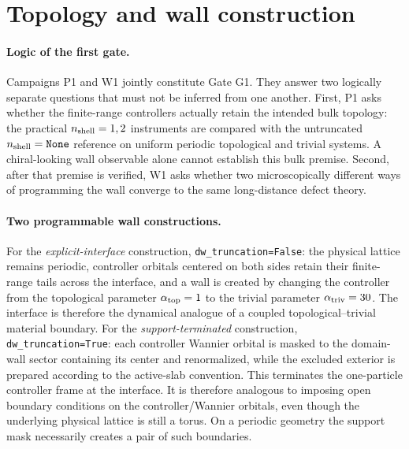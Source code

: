 \documentclass[aps,prx,twocolumn,floatfix,nofootinbib,superscriptaddress,longbibliography]{revtex4-2}
\newcommand{\code}[1]{\texttt{#1}}
\begin{document}
\section{Topology and wall construction}

\paragraph*{Logic of the first gate.}
Campaigns P1 and W1 jointly constitute Gate G1.  They answer two logically separate
questions that must not be inferred from one another.  First, P1 asks whether the
finite-range controllers actually retain the intended bulk topology: the practical
$n_{\rm shell}=1,2$ instruments are compared with the untruncated
$n_{\rm shell}=\texttt{None}$ reference on uniform periodic topological and trivial
systems.  A chiral-looking wall observable alone cannot establish this bulk premise.
Second, after that premise is verified, W1 asks whether two microscopically different
ways of programming the wall converge to the same long-distance defect theory.

\paragraph*{Two programmable wall constructions.}\mbox{}\linebreak
For the \emph{explicit-interface} construction,
\code{dw\_truncation=False}: the physical lattice remains periodic, controller orbitals
centered on both sides retain their finite-range tails across the interface, and a wall is
created by changing the controller from the topological parameter
$\alpha_{\rm top}=1$ to the trivial parameter $\alpha_{\rm triv}=30$.  The interface is
therefore the dynamical analogue of a coupled topological--trivial material boundary.
For the \emph{support-terminated} construction, \code{dw\_truncation=True}: each
controller Wannier orbital is masked to the domain-wall sector containing its center and
renormalized, while the excluded exterior is prepared according to the active-slab
convention.  This terminates the one-particle controller frame at the interface.  It is
therefore analogous to imposing open boundary conditions on the controller/Wannier
orbitals, even though the underlying physical lattice is still a torus.  On a periodic
geometry the support mask necessarily creates a pair of such boundaries.
\end{document}

